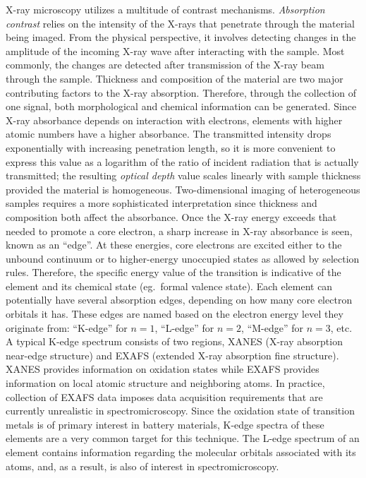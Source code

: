 \documentclass[journal=cmatex,manuscript=perspective]{achemso}
\begin{document}
X-ray microscopy utilizes a multitude of contrast
mechanisms. \emph{Absorption contrast} relies on the intensity of the
X-rays that penetrate through the material being imaged. From the
physical perspective, it involves detecting changes in the amplitude
of the incoming X-ray wave after interacting with the sample. Most
commonly, the changes are detected after transmission of the X-ray
beam through the sample. Thickness and composition of the material are
two major contributing factors to the X-ray absorption. Therefore,
through the collection of one signal, both morphological and chemical
information can be generated. Since X-ray absorbance depends on
interaction with electrons, elements with higher atomic numbers have a
higher absorbance. The transmitted intensity drops exponentially with
increasing penetration length, so it is more convenient to express
this value as a logarithm of the ratio of incident radiation that is
actually transmitted; the resulting \emph{optical depth} value scales
linearly with sample thickness provided the material is
homogeneous. Two-dimensional imaging of heterogeneous samples requires
a more sophisticated interpretation since thickness and composition
both affect the absorbance. Once the X-ray energy exceeds that needed
to promote a core electron, a sharp increase in X-ray absorbance is
seen, known as an ``edge''. At these energies, core electrons are
excited either to the unbound continuum or to higher-energy unoccupied
states as allowed by selection rules. Therefore, the specific energy
value of the transition is indicative of the element and its chemical
state (eg.\ formal valence state). Each element can potentially have
several absorption edges, depending on how many core electron orbitals
it has. These edges are named based on the electron energy level they
originate from: ``K-edge'' for $n=1$, ``L-edge'' for $n=2$, ``M-edge''
for $n=3$, etc. A typical K-edge spectrum consists of two regions,
XANES (X-ray absorption near-edge structure) and EXAFS (extended X-ray
absorption fine structure). XANES provides information on oxidation
states while EXAFS provides information on local atomic structure and
neighboring atoms. In practice, collection of EXAFS data imposes data
acquisition requirements that are currently unrealistic in
spectromicroscopy. Since the oxidation state of transition metals is
of primary interest in battery materials, K-edge spectra of these
elements are a very common target for this technique. The L-edge
spectrum of an element contains information regarding the molecular
orbitals associated with its atoms, and, as a result, is also of
interest in spectromicroscopy.
\end{document}
